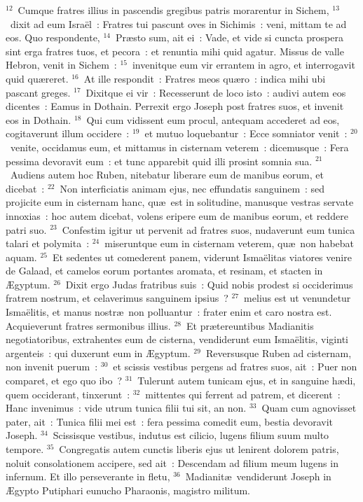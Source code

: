 ${}^{12}$~Cumque fratres illius in pascendis gregibus patris morarentur in Sichem,
${}^{13}$~dixit ad eum Isra\"el~: Fratres tui pascunt oves in Sichimis~: veni, mittam te ad eos. Quo respondente,
${}^{14}$~Pr\ae sto sum, ait ei~: Vade, et vide si cuncta prospera sint erga fratres tuos, et pecora~: et renuntia mihi quid agatur. Missus de valle Hebron, venit in Sichem~:
${}^{15}$~invenitque eum vir errantem in agro, et interrogavit quid qu\ae reret.
${}^{16}$~At ille respondit~: Fratres meos qu\ae ro~: indica mihi ubi pascant greges.
${}^{17}$~Dixitque ei vir~: Recesserunt de loco isto~: audivi autem eos dicentes~: Eamus in Dothain. Perrexit ergo Joseph post fratres suos, et invenit eos in Dothain.
${}^{18}$~Qui cum vidissent eum procul, antequam accederet ad eos, cogitaverunt illum occidere~:
${}^{19}$~et mutuo loquebantur~: Ecce somniator venit~:
${}^{20}$~venite, occidamus eum, et mittamus in cisternam veterem~: dicemusque~: Fera pessima devoravit eum~: et tunc apparebit quid illi prosint somnia sua.
${}^{21}$~Audiens autem hoc Ruben, nitebatur liberare eum de manibus eorum, et dicebat~:
${}^{22}$~Non interficiatis animam ejus, nec effundatis sanguinem~: sed projicite eum in cisternam hanc, qu\ae\ est in solitudine, manusque vestras servate innoxias~: hoc autem dicebat, volens eripere eum de manibus eorum, et reddere patri suo.
${}^{23}$~Confestim igitur ut pervenit ad fratres suos, nudaverunt eum tunica talari et polymita~:
${}^{24}$~miseruntque eum in cisternam veterem, qu\ae\ non habebat aquam.
${}^{25}$~Et sedentes ut comederent panem, viderunt Isma\"elitas viatores venire de Galaad, et camelos eorum portantes aromata, et resinam, et stacten in \AE gyptum.
${}^{26}$~Dixit ergo Judas fratribus suis~: Quid nobis prodest si occiderimus fratrem nostrum, et celaverimus sanguinem ipsius~?
${}^{27}$~melius est ut venundetur Isma\"elitis, et manus nostr\ae\ non polluantur~: frater enim et caro nostra est. Acquieverunt fratres sermonibus illius.
${}^{28}$~Et pr\ae tereuntibus Madianitis negotiatoribus, extrahentes eum de cisterna, vendiderunt eum Isma\"elitis, viginti argenteis~: qui duxerunt eum in \AE gyptum.
${}^{29}$~Reversusque Ruben ad cisternam, non invenit puerum~:
${}^{30}$~et scissis vestibus pergens ad fratres suos, ait~: Puer non comparet, et ego quo ibo~?
${}^{31}$~Tulerunt autem tunicam ejus, et in sanguine h\ae di, quem occiderant, tinxerunt~:
${}^{32}$~mittentes qui ferrent ad patrem, et dicerent~: Hanc invenimus~: vide utrum tunica filii tui sit, an non.
${}^{33}$~Quam cum agnovisset pater, ait~: Tunica filii mei est~: fera pessima comedit eum, bestia devoravit Joseph.
${}^{34}$~Scissisque vestibus, indutus est cilicio, lugens filium suum multo tempore.
${}^{35}$~Congregatis autem cunctis liberis ejus ut lenirent dolorem patris, noluit consolationem accipere, sed ait~: Descendam ad filium meum lugens in infernum. Et illo perseverante in fletu,
${}^{36}$~Madianit\ae\ vendiderunt Joseph in \AE gypto Putiphari eunucho Pharaonis, magistro militum.

